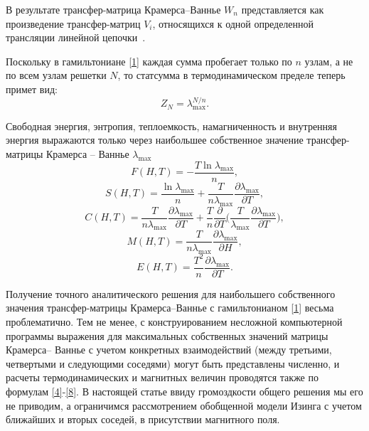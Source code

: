 В результате трансфер-матрица Крамерса--Ваннье $W_n$ представляется как произведение трансфер-матриц $V_i$, относящихся к одной определенной трансляции линейной цепочки~\cite{scbib1, vakbib1, vakbib3}.

Поскольку в гамильтониане \eqref{1} каждая сумма пробегает только по $n$ узлам, а не по всем узлам решетки $N$, то статсумма в термодинамическом пределе теперь примет вид:
\begin{equation}
Z_N=\lambda_{\text{max}}^{N/n}.
\label{3}
\end{equation}

Свободная энергия, энтропия, теплоемкость, намагниченность и внутренняя энергия выражаются только через наибольшее собственное значение трансфер-матрицы Крамерса -- Ваннье $\lambda_{\text{max}}$
\begin{equation}
F(H,T)=-\frac{T \ln \lambda_{\text{max}}}{n},
\label{4}
\end{equation}
\begin{equation}
S(H,T)=\frac{\ln \lambda_{\text{max}}}{n}+\frac{T}{n\lambda_{\text{max}}}\frac{\partial \lambda_{\text{max}}}{\partial T},
\label{5}
\end{equation}
\begin{equation}
C(H,T)=\frac{T}{n\lambda_{\text{max}}}\frac{\partial \lambda_{\text{max}}}{\partial T} + \frac{T}{n}\frac{\partial }{\partial T}\bigg(\frac{T}{\lambda_{\text{max}}}\frac{\partial \lambda_{\text{max}}}{\partial T}\bigg),
\label{6}
\end{equation}
\begin{equation}
M(H,T)=\frac{T}{n\lambda_{\text{max}}}\frac{\partial \lambda_{\text{max}}}{\partial H},
\label{7}
\end{equation}
\begin{equation}
E(H,T)=\frac{T^2}{n}\frac{\partial \lambda_{\text{max}}}{\partial T}.
\label{8}
\end{equation}

Получение точного аналитического решения для наибольшего собственного значения трансфер-матрицы Крамерса--Ваннье с гамильтонианом \eqref{1} весьма проблематично. Тем не менее, с конструированием несложной компьютерной программы выражения для максимальных собственных значений матрицы Крамерса-- Ваннье с учетом конкретных взаимодействий (между третьими, четвертыми и следующими соседями) могут быть представлены численно, и расчеты термодинамических и магнитных величин проводятся также по формулам \eqref{4}-\eqref{8}. В настоящей статье ввиду громоздкости общего решения мы его не приводим, а ограничимся рассмотрением обобщенной модели Изинга с учетом ближайших и вторых соседей, в присутствии магнитного поля.

